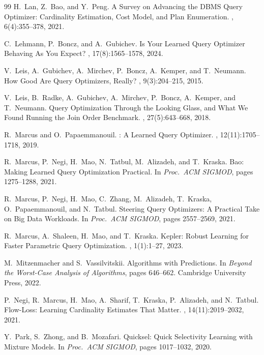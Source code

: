 \documentclass[sigconf,natbib=false]{article}
\begin{document}
\begin{thebibliography}{99}
H.~Lan, Z.~Bao, and Y.~Peng.
\newblock A Survey on Advancing the {DBMS} Query Optimizer: Cardinality
  Estimation, Cost Model, and Plan Enumeration.
, 6(4):355--378, 2021.

C.~Lehmann, P.~Boncz, and A.~Gubichev.
\newblock Is Your Learned Query Optimizer Behaving As You Expect?
, 17(8):1565--1578, 2024.

V.~Leis, A.~Gubichev, A.~Mirchev, P.~Boncz, A.~Kemper, and T.~Neumann.
\newblock How Good Are Query Optimizers, Really?
, 9(3):204--215, 2015.

V.~Leis, B.~Radke, A.~Gubichev, A.~Mirchev, P.~Boncz, A.~Kemper, and
T.~Neumann.
\newblock Query Optimization Through the Looking Glass, and What We Found
  Running the Join Order Benchmark.
, 27(5):643--668, 2018.

R.~Marcus and O.~Papaemmanouil.
: A Learned Query Optimizer.
, 12(11):1705--1718, 2019.

R.~Marcus, P.~Negi, H.~Mao, N.~Tatbul, M.~Alizadeh, and T.~Kraska.
\newblock Bao: Making Learned Query Optimization Practical.
\newblock In {\em Proc.\ ACM SIGMOD}, pages 1275--1288, 2021.

R.~Marcus, P.~Negi, H.~Mao, C.~Zhang, M.~Alizadeh, T.~Kraska,
O.~Papaemmanouil, and N.~Tatbul.
\newblock Steering Query Optimizers: A Practical Take on Big Data Workloads.
\newblock In {\em Proc.\ ACM SIGMOD}, pages 2557--2569, 2021.

R.~Marcus, A.~Shaleen, H.~Mao, and T.~Kraska.
\newblock Kepler: Robust Learning for Faster Parametric Query Optimization.
, 1(1):1--27, 2023.

M.~Mitzenmacher and S.~Vassilvitskii.
\newblock Algorithms with Predictions.
\newblock In {\em Beyond the Worst-Case Analysis of Algorithms},
  pages 646--662. Cambridge University Press, 2022.

P.~Negi, R.~Marcus, H.~Mao, A.~Sharif, T.~Kraska, P.~Alizadeh, and N.~Tatbul.
\newblock Flow-Loss: Learning Cardinality Estimates That Matter.
, 14(11):2019--2032, 2021.

Y.~Park, S.~Zhong, and B.~Mozafari.
\newblock Quicksel: Quick Selectivity Learning with Mixture Models.
\newblock In {\em Proc.\ ACM SIGMOD}, pages 1017--1032, 2020.


\end{thebibliography}
\end{document}
